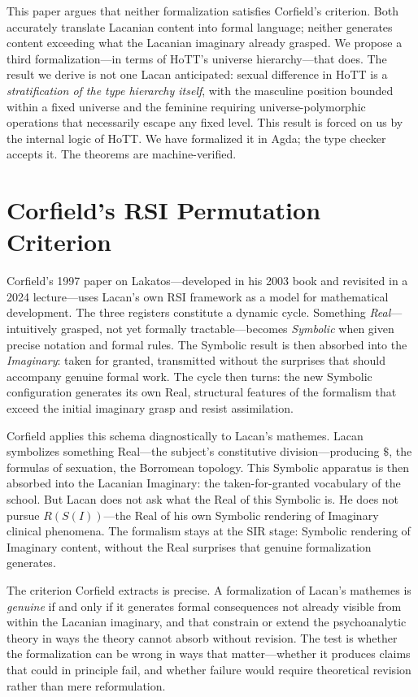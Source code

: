 \documentclass[12pt]{article}
\theoremstyle{definition}
\theoremstyle{remark}
\begin{document}
This paper argues that neither formalization satisfies Corfield's criterion. Both accurately translate Lacanian content into formal language; neither generates content exceeding what the Lacanian imaginary already grasped. We propose a third formalization---in terms of HoTT's universe hierarchy---that does. The result we derive is not one Lacan anticipated: sexual difference in HoTT is a \emph{stratification of the type hierarchy itself}, with the masculine position bounded within a fixed universe and the feminine requiring universe-polymorphic operations that necessarily escape any fixed level. This result is forced on us by the internal logic of HoTT. We have formalized it in Agda; the type checker accepts it. The theorems are machine-verified.

\section{Corfield's RSI Permutation Criterion}

Corfield's 1997 paper on Lakatos---developed in his 2003 book and revisited in a 2024 lecture---uses Lacan's own RSI framework as a model for mathematical development. The three registers constitute a dynamic cycle. Something \emph{Real}---intuitively grasped, not yet formally tractable---becomes \emph{Symbolic} when given precise notation and formal rules. The Symbolic result is then absorbed into the \emph{Imaginary}: taken for granted, transmitted without the surprises that should accompany genuine formal work. The cycle then turns: the new Symbolic configuration generates its own Real, structural features of the formalism that exceed the initial imaginary grasp and resist assimilation.

Corfield applies this schema diagnostically to Lacan's mathemes. Lacan symbolizes something Real---the subject's constitutive division---producing $\$$, the formulas of sexuation, the Borromean topology. This Symbolic apparatus is then absorbed into the Lacanian Imaginary: the taken-for-granted vocabulary of the school. But Lacan does not ask what the Real of this Symbolic is. He does not pursue $R(S(I))$---the Real of his own Symbolic rendering of Imaginary clinical phenomena. The formalism stays at the SIR stage: Symbolic rendering of Imaginary content, without the Real surprises that genuine formalization generates.

The criterion Corfield extracts is precise. A formalization of Lacan's mathemes is \emph{genuine} if and only if it generates formal consequences not already visible from within the Lacanian imaginary, and that constrain or extend the psychoanalytic theory in ways the theory cannot absorb without revision. The test is whether the formalization can be wrong in ways that matter---whether it produces claims that could in principle fail, and whether failure would require theoretical revision rather than mere reformulation.
\end{document}
